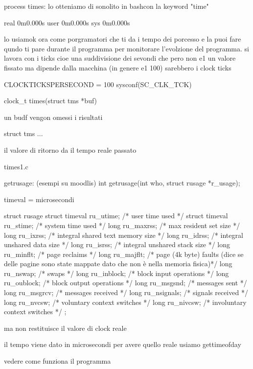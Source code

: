 process times:
lo otteniamo di sonolito in bashcon la keyword "time"

real	0m0.000s
user	0m0.000s
sys	0m0.000s

lo usiamok ora come porgramatori che ti da i tempo dei porcesso e la puoi fare qundo ti pare durante il programma per monitorare l'evolzione del programma. si lavora con i ticks cioe una suddivisione dei sevondi che pero non e1 un valore fissato ma dipende dalla macchina (in genere e1 100) sarebbero i clock ticks

CLOCKTICKSPERSECOND = 100
sysconf(SC_CLK_TCK)

clock_t times(struct tms *buf)

un budf vengon omessi i risultati

struct tms {
	...
}

il valore di ritorno da il tempo reale passato

times1.c


getrusage: (esempi su moodlis)
int getrusage(int who, struct rusage *r_usage);

timeval = microsecondi

struct rusage {
             struct timeval ru_utime; /* user time used */
             struct timeval ru_stime; /* system time used */
             long ru_maxrss;          /* max resident set size */
             long ru_ixrss;           /* integral shared text memory size */
             long ru_idrss;           /* integral unshared data size */
             long ru_isrss;           /* integral unshared stack size */
             long ru_minflt;          /* page reclaims */
	     long ru_majflt;          /* page (4k byte) faults (dice se delle pagine sono state mappate dato che non è nella memoria fisica)*/
             long ru_nswap;           /* swaps */
             long ru_inblock;         /* block input operations */
             long ru_oublock;         /* block output operations */
             long ru_msgsnd;          /* messages sent */
             long ru_msgrcv;          /* messages received */
             long ru_nsignals;        /* signals received */
             long ru_nvcsw;           /* voluntary context switches */
             long ru_nivcsw;          /* involuntary context switches */
};

ma non restituisce il valore di clock reale

il tempo viene dato in microsecondi per avere quello reale usiamo gettimeofday


vedere come funziona il programma
